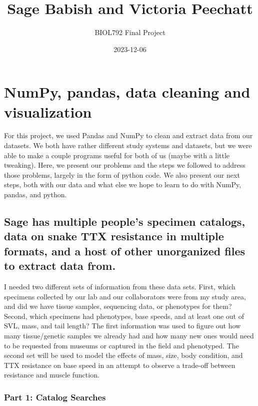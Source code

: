 \documentclass[
]{article}
\title{Sage Babish and Victoria Peechatt}
\author{BIOL792 Final Project}
\date{2023-12-06}
\begin{document}
\maketitle

\hypertarget{numpy-pandas-data-cleaning-and-visualization}{%
\section{NumPy, pandas, data cleaning and
visualization}\label{numpy-pandas-data-cleaning-and-visualization}}

For this project, we used Pandas and NumPy to clean and extract data
from our datasets. We both have rather different study systems and
datasets, but we were able to make a couple programs useful for both of
us (maybe with a little tweaking). Here, we present our problems and the
steps we followed to address those problems, largely in the form of
python code. We also present our next steps, both with our data and what
else we hope to learn to do with NumPy, pandas, and python.

\hypertarget{sage-has-multiple-peoples-specimen-catalogs-data-on-snake-ttx-resistance-in-multiple-formats-and-a-host-of-other-unorganized-files-to-extract-data-from.}{%
\subsection{Sage has multiple people's specimen catalogs, data on snake
TTX resistance in multiple formats, and a host of other unorganized
files to extract data
from.}\label{sage-has-multiple-peoples-specimen-catalogs-data-on-snake-ttx-resistance-in-multiple-formats-and-a-host-of-other-unorganized-files-to-extract-data-from.}}

I needed two different sets of information from these data sets. First,
which specimens collected by our lab and our collaborators were from my
study area, and did we have tissue samples, sequencing data, or
phenotypes for them? Second, which specimens had phenotypes, base
speeds, and at least one out of SVL, mass, and tail length? The first
information was used to figure out how many tissue/genetic samples we
already had and how many new ones would need to be requested from
museums or captured in the field and phenotyped. The second set will be
used to model the effects of mass, size, body condition, and TTX
resistance on base speed in an attempt to observe a trade-off between
resistance and muscle function.

\hypertarget{part-1-catalog-searches}{%
\subsubsection{Part 1: Catalog Searches}\label{part-1-catalog-searches}}
\end{document}
